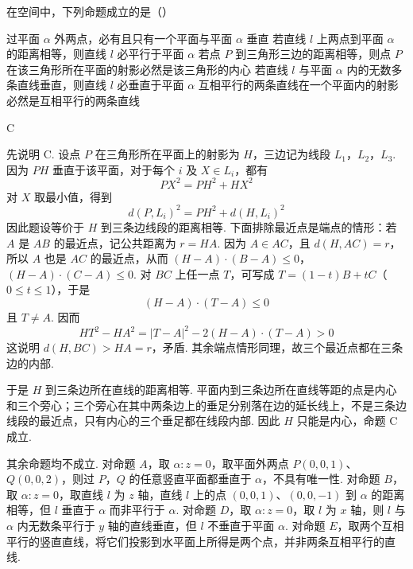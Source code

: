 \documentclass[UTF8,a4paper,oneside,11pt]{ctexbook}
\begin{document}
\begin{problem}

在空间中，下列命题成立的是（\quad）

\choicesfive
    {过平面 \(\alpha\) 外两点，必有且只有一个平面与平面 \(\alpha\) 垂直}
    {若直线 \(l\) 上两点到平面 \(\alpha \) 的距离相等，则直线 \(l\) 必平行于平面 \(\alpha \)}
    {若点 \(P\) 到三角形三边的距离相等，则点 \(P\) 在该三角形所在平面的射影必然是该三角形的内心}
    {若直线 \(l\) 与平面 \(\alpha \) 内的无数多条直线垂直，则直线 \(l\) 必垂直于平面 \(\alpha \)}
    {互相平行的两条直线在一个平面内的射影必然是互相平行的两条直线}
\end{problem}

\begin{answer}
C
\end{answer}

\begin{solution}
先说明 C. 设点 \(P\) 在三角形所在平面上的射影为 \(H\)，三边记为线段 \(L_1\)，\(L_2\)，\(L_3\). 因为 \(PH\) 垂直于该平面，对于每个 \(i\) 及 \(X\in L_i\)，都有
\[
PX^2=PH^2+HX^2
\]
对 \(X\) 取最小值，得到
\[
d(P,L_i)^2=PH^2+d(H,L_i)^2
\]
因此题设等价于 \(H\) 到三条边线段的距离相等. 下面排除最近点是端点的情形：若 \(A\) 是 \(AB\) 的最近点，记公共距离为 \(r=HA\). 因为 \(A\in AC\)，且 \(d(H,AC)=r\)，所以 \(A\) 也是 \(AC\) 的最近点，从而
\((H-A)\cdot(B-A)\leq0\)，\((H-A)\cdot(C-A)\leq0\).
对 \(BC\) 上任一点 \(T\)，可写成 \(T=(1-t)B+tC\)（\(0\leq t\leq1\)），于是
\[
(H-A)\cdot(T-A)\leq0
\]
且 \(T\ne A\). 因而
\[
HT^2-HA^2=|T-A|^2-2(H-A)\cdot(T-A)>0
\]
这说明 \(d(H,BC)>HA=r\)，矛盾. 其余端点情形同理，故三个最近点都在三条边的内部.

于是 \(H\) 到三条边所在直线的距离相等. 平面内到三条边所在直线等距的点是内心和三个旁心；三个旁心在其中两条边上的垂足分别落在边的延长线上，不是三条边线段的最近点，只有内心的三个垂足都在线段内部. 因此 \(H\) 只能是内心，命题 C 成立.

其余命题均不成立. 对命题 \(A\)，取 \(\alpha:z=0\)，取平面外两点 \(P(0,0,1)\)、\(Q(0,0,2)\)，则过 \(P\)，\(Q\) 的任意竖直平面都垂直于 \(\alpha\)，不具有唯一性. 对命题 \(B\)，取 \(\alpha:z=0\)，取直线 \(l\) 为 \(z\) 轴，直线 \(l\) 上的点 \((0,0,1)\)、\((0,0,-1)\) 到 \(\alpha\) 的距离相等，但 \(l\) 垂直于 \(\alpha\) 而非平行于 \(\alpha\). 对命题 \(D\)，取 \(\alpha:z=0\)，取 \(l\) 为 \(x\) 轴，则 \(l\) 与 \(\alpha\) 内无数条平行于 \(y\) 轴的直线垂直，但 \(l\) 不垂直于平面 \(\alpha\). 对命题 \(E\)，取两个互相平行的竖直直线，将它们投影到水平面上所得是两个点，并非两条互相平行的直线.
\end{solution}
\end{document}
